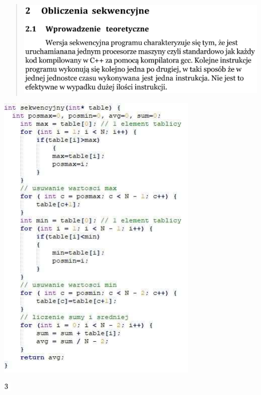 \documentclass[
]{article}
\begin{document}
\begin{quote}
\includegraphics[width=4.91667in,height=1.86111in]{vertopal_45f5e71363bf454ba37a280ca069ec4b/media/image14.png}
\end{quote}

\includegraphics[width=3.81944in,height=5.58194in]{vertopal_45f5e71363bf454ba37a280ca069ec4b/media/image15.png}

\includegraphics[width=0.13889in,height=0.19444in]{vertopal_45f5e71363bf454ba37a280ca069ec4b/media/image16.png}
\end{document}
